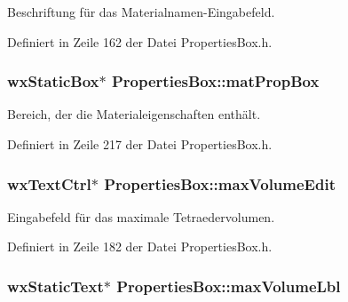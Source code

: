 Beschriftung für das Materialnamen-\/\-Eingabefeld. 



Definiert in Zeile 162 der Datei Properties\-Box.\-h.

\hypertarget{classPropertiesBox_a1ff3669bf863d80a26d2d9874b1868e1}{
\subsubsection[{mat\-Prop\-Box}]{\setlength{\rightskip}{0pt plus 5cm}wx\-Static\-Box$\ast$ Properties\-Box\-::mat\-Prop\-Box\hspace{0.3cm}{\ttfamily [private]}}}\label{classPropertiesBox_a1ff3669bf863d80a26d2d9874b1868e1}


Bereich, der die Materialeigenschaften enthält. 



Definiert in Zeile 217 der Datei Properties\-Box.\-h.

\hypertarget{classPropertiesBox_ab738d2ef986a20be47a86bb676ae11db}{
\subsubsection[{max\-Volume\-Edit}]{\setlength{\rightskip}{0pt plus 5cm}wx\-Text\-Ctrl$\ast$ Properties\-Box\-::max\-Volume\-Edit\hspace{0.3cm}{\ttfamily [private]}}}\label{classPropertiesBox_ab738d2ef986a20be47a86bb676ae11db}


Eingabefeld für das maximale Tetraedervolumen. 



Definiert in Zeile 182 der Datei Properties\-Box.\-h.

\hypertarget{classPropertiesBox_ac37df12581fc6f63aa87b2807d62fdb5}{
\subsubsection[{max\-Volume\-Lbl}]{\setlength{\rightskip}{0pt plus 5cm}wx\-Static\-Text$\ast$ Properties\-Box\-::max\-Volume\-Lbl\hspace{0.3cm}{\ttfamily [private]}}}\label{classPropertiesBox_ac37df12581fc6f63aa87b2807d62fdb5}


